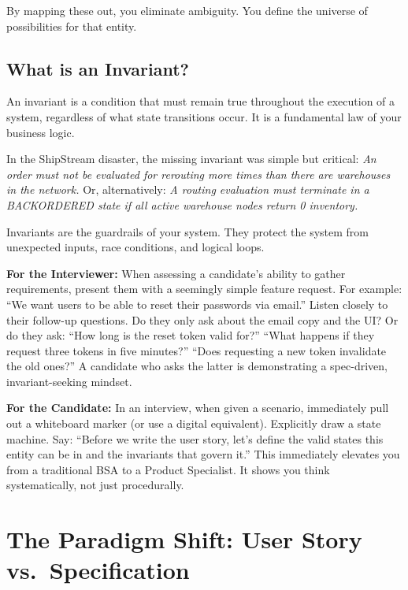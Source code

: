 \documentclass[
  11pt,
  openany,
  oneside]{book}
\renewenvironment{quote}{\begin{customquote}}{\end{customquote}}
\begin{document}
By mapping these out, you eliminate ambiguity. You define the universe
of possibilities for that entity.

\subsection{What is an Invariant?}\label{what-is-an-invariant}

An invariant is a condition that must remain true throughout the
execution of a system, regardless of what state transitions occur. It is
a fundamental law of your business logic.

In the ShipStream disaster, the missing invariant was simple but
critical: \emph{An order must not be evaluated for rerouting more times
than there are warehouses in the network.} Or, alternatively: \emph{A
routing evaluation must terminate in a BACKORDERED state if all active
warehouse nodes return 0 inventory.}

Invariants are the guardrails of your system. They protect the system
from unexpected inputs, race conditions, and logical loops.

\begin{quote}
\textbf{For the Interviewer:} When assessing a candidate's ability to
gather requirements, present them with a seemingly simple feature
request. For example: ``We want users to be able to reset their
passwords via email.'' Listen closely to their follow-up questions. Do
they only ask about the email copy and the UI? Or do they ask: ``How
long is the reset token valid for?'' ``What happens if they request
three tokens in five minutes?'' ``Does requesting a new token invalidate
the old ones?'' A candidate who asks the latter is demonstrating a
spec-driven, invariant-seeking mindset.
\end{quote}

\begin{quote}
\textbf{For the Candidate:} In an interview, when given a scenario,
immediately pull out a whiteboard marker (or use a digital equivalent).
Explicitly draw a state machine. Say: ``Before we write the user story,
let's define the valid states this entity can be in and the invariants
that govern it.'' This immediately elevates you from a traditional BSA
to a Product Specialist. It shows you think systematically, not just
procedurally.
\end{quote}

\section{The Paradigm Shift: User Story
vs.~Specification}\label{the-paradigm-shift-user-story-vs.-specification}
\end{document}
